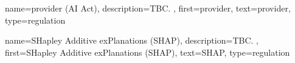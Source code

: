 {name={provider (AI Act)},
	description={TBC. },
	first={provider},
	text={provider},
	type=regulation
}

{name={SHapley Additive exPlanations (SHAP)},
	description={TBC. },
	first={SHapley Additive exPlanations (SHAP)},
	text={SHAP},
	type=regulation
}









